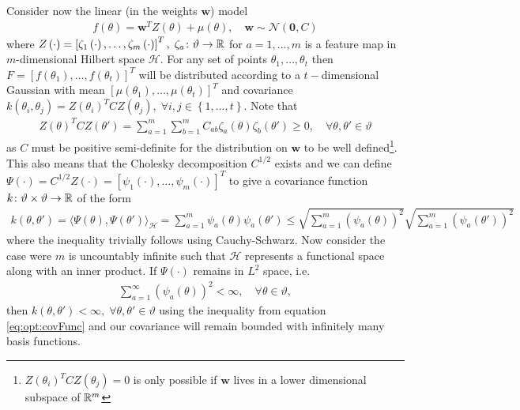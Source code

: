 Consider now the linear (in the weights $\mathbf{w}$) model
\begin{align}
\label{eq:opt:linModel}
f \left(\theta\right) = \mathbf{w}^T Z \left(\theta\right)  + \mu\left(\theta\right), \quad \mathbf{w} \sim \mathcal{N} \left(\mathbf{0}, C\right)
\end{align}
where $Z\left(\cdot\right) = \left[\zeta_1\left(\cdot\right),\dots,\zeta_m\left(\cdot\right)\right]^T, \; \zeta_a \colon \vartheta \rightarrow \mathbb{R}$ for $a = 1,\dots,m$ is a feature map in $m$-dimensional Hilbert space $\mathcal{H}$.  For any set of points $\theta_1,\dots,\theta_t$ then $F = \left[f\left(\theta_1\right),\dots,f\left(\theta_t\right)\right]^T$ will be distributed according to a $t-$dimensional Gaussian with mean $\left[\mu\left(\theta_1\right),\dots,\mu\left(\theta_t\right)\right]^T$ and covariance $k\left(\theta_i,\theta_j\right) = Z\left(\theta_i\right)^T C Z\left(\theta_j\right), \; \forall i,j \in \left\{1,\dots,t\right\}$.  Note that 
\begin{align}
\label{eq:opt:poskernel}
Z\left(\theta\right)^T C Z\left(\theta'\right) = \sum_{a=1}^{m} \sum_{b=1}^{m} C_{ab}\zeta_a\left(\theta\right)\zeta_b\left(\theta'\right) \ge 0, \quad \forall \theta, \theta' \in \vartheta
\end{align}
as $C$ must be positive semi-definite for the distribution on $\mathbf{w}$ to be well defined\footnote{$Z\left(\theta_i\right)^T C Z\left(\theta_j\right)=0$ is only possible if $\mathbf{w}$ lives in a lower dimensional subspace of $\mathbb{R}^m$}.  This also means that the Cholesky decomposition $C^{1/2}$ exists and we can define $\Psi\left(\cdot\right) = C^{1/2} Z\left(\cdot\right) = \left[\psi_1\left(\cdot\right),\dots,\psi_m\left(\cdot\right)\right]^T$ to give a covariance function $k \colon \vartheta \times \vartheta \rightarrow \mathbb{R}$ of the form
\begin{align}
\label{eq:opt:covFunc}
k\left(\theta,\theta'\right) = \langle\Psi\left(\theta\right), \Psi\left(\theta'\right)\rangle_{\mathcal{H}} = \sum_{a=1}^{m} \psi_a\left(\theta\right) \psi_a\left(\theta'\right) \le \sqrt{\sum_{a=1}^{m} \left(\psi_a\left(\theta\right)\right)^2} \sqrt{\sum_{a=1}^{m} \left(\psi_a\left(\theta'\right)\right)^2}
\end{align}
where the inequality trivially follows using Cauchy-Schwarz.  Now consider the case were $m$ is uncountably infinite such that $\mathcal{H}$ represents a functional space along with an inner product.  If $\Psi \left(\cdot\right)$ remains 
in $L^2$ space, i.e.
\begin{align}
\label{eq:opt:l2Space}
\sum_{a=1}^{\infty} \left(\psi_a\left(\theta\right)\right)^2 < \infty, \quad \forall \theta \in \vartheta,
\end{align}
then $k\left(\theta,\theta'\right) < \infty, \; \forall \theta, \theta' \in \vartheta$ using the inequality from equation \eqref{eq:opt:covFunc} and our covariance will remain bounded with infinitely many basis functions.

